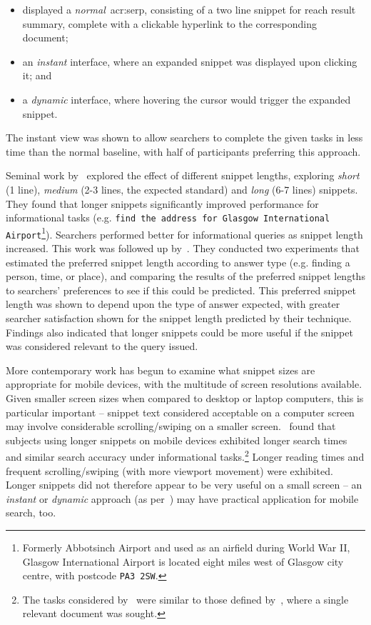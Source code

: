 \begin{itemize}
    \item{displayed a \emph{normal}~\gls{acr:serp}, consisting of a two line snippet for reach result summary, complete with a clickable hyperlink to the corresponding document;}
    \item{an \emph{instant} interface, where an expanded snippet was displayed upon clicking it; and}
    \item{a \emph{dynamic} interface, where hovering the cursor would trigger the expanded snippet.}
\end{itemize}

The instant view was shown to allow searchers to complete the given tasks in less time than the normal baseline, with half of participants preferring this approach.

Seminal work by~\cite{cutrell2007eye_tracking} explored the effect of different snippet lengths, exploring \emph{short} (1 line), \emph{medium} (2-3 lines, the expected standard) and \emph{long} (6-7 lines) snippets. They found that longer snippets significantly improved performance for informational tasks (e.g. \texttt{find the address for Glasgow International Airport}\footnote{Formerly Abbotsinch Airport and used as an airfield during World War II, Glasgow International Airport is located eight miles west of Glasgow city centre, with postcode \texttt{PA3 2SW}.}). Searchers performed better for informational queries as snippet length increased. This work was followed up by~\cite{kaisser2008improving}. They conducted two experiments that estimated the preferred snippet length according to answer type (e.g. finding a person, time, or place), and comparing the results of the preferred snippet lengths to searchers' preferences to see if this could be predicted. This preferred snippet length was shown to depend upon the type of answer expected, with greater searcher satisfaction shown for the snippet length predicted by their technique. Findings also indicated that longer snippets could be more useful if the snippet was considered relevant to the query issued.

More contemporary work has begun to examine what snippet sizes are appropriate for mobile devices, with the multitude of screen resolutions available. Given smaller screen sizes when compared to desktop or laptop computers, this is particular important -- snippet text considered acceptable on a computer screen may involve considerable scrolling/swiping on a smaller screen.~\cite{kim2017mobile_search_snippets} found that subjects using longer snippets on mobile devices exhibited longer search times and similar search accuracy under informational tasks.\footnote{The tasks considered by~\cite{kim2017mobile_search_snippets} were similar to those defined by~\cite{cutrell2007eye_tracking}, where a single relevant document was sought.} Longer reading times and frequent scrolling/swiping (with more viewport movement) were exhibited. Longer snippets did not therefore appear to be very useful on a small screen -- an \emph{instant} or \emph{dynamic} approach (as per~\cite{paek2004wavelens}) may have practical application for mobile search, too.

